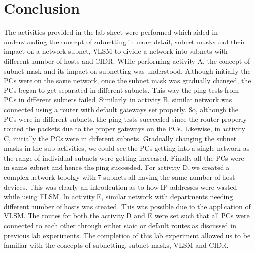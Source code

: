 \documentclass{lab_sheet}
\begin{document}
     \section{Conclusion}
     The activities provided in the lab sheet were performed which aided in understanding the concept of subnetting in more detail, subnet masks and their impact on a network subnet, VLSM to divide a network into subnets with different number of hosts and CIDR. While performing activity A, the concept of subnet mask and its impact on subnetting was understood. Although initially the PCs were on the same network, once the subnet mask was gradually changed, the PCs began to get separated in different subnets. This way the ping tests from PCs in different subnets failed. Similarly, in activity B, similar network was connected using a router with default gateways set properly. So, although the PCs were in different subnets, the ping tests succeeded since the router properly routed the packets due to the proper gateways on the PCs. Likewise, in activity C, initially the PCs were in different subnets. Gradually changing the subnet masks in the sub activities, we could see the PCs getting into a single network as the range of individual subnets were getting increased. Finally all the PCs were in same subnet and hence the ping succeeded. For activity D, we created a complex network topolgy with 7 subnets all having the same number of host devices. This was clearly an introdcution as to how IP addresses were wasted while using FLSM. In activity E, similar network with departments needing different number of hosts was created. This was possible due to the application of VLSM. The routes for both the activity D and E were set such that all PCs were connected to each other through either staic or default routes as discussed in previous lab experiments. The completion of this lab experiment allowed us to be familiar with the concepts of subnetting, subnet masks, VLSM and CIDR.
     
\end{document}
